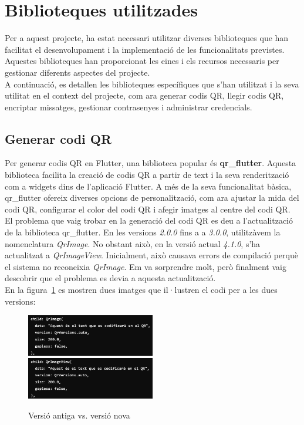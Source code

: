 \documentclass[a4paper,12pt,twoside]{ThesisStyle}
\begin{document}
\section{Biblioteques utilitzades}
\label{sec: Biblioteques utilitzades}


Per a aquest projecte, ha estat necessari utilitzar diverses biblioteques que han facilitat el desenvolupament i la implementació de les funcionalitats previstes. Aquestes biblioteques han proporcionat les eines i els recursos necessaris per gestionar diferents aspectes del projecte.\\

A continuació, es detallen les biblioteques específiques que s'han utilitzat i la seva utilitat en el context del projecte, com ara generar codis QR, llegir codis QR, encriptar missatges, gestionar contrasenyes i administrar credencials.




\subsection{Generar codi QR}
\label{subsec: Generar codi QR}

Per generar codis QR en Flutter, una biblioteca popular és \textbf{qr\_flutter}. Aquesta biblioteca facilita la creació de codis QR a partir de text i la seva renderització com a widgets dins de l'aplicació Flutter. A més de la seva funcionalitat bàsica, qr\_flutter ofereix diverses opcions de personalització, com ara ajustar la mida del codi QR, configurar el color del codi QR i afegir imatges al centre del codi QR.\\

El problema que vaig trobar en la generació del codi QR es deu a l'actualització de la biblioteca qr\_flutter. En les versions \textit{2.0.0} fins a a \textit{3.0.0}, utilitzàvem la nomenclatura \textit{QrImage}. No obstant això, en la versió actual \textit{4.1.0}, s'ha actualitzat a \textit{QrImageView}. Inicialment, això causava errors de compilació perquè el sistema no reconeixia \textit{QrImage}. Em va sorprendre molt, però finalment vaig descobrir que el problema es devia a aquesta actualització.\\ 

En la figura~\ref{fig:Versió antiga vs. versió nova}  es mostren dues imatges que il·lustren el codi per a les dues versions:

\begin{figure}[h]
    \centering
    \includegraphics[width=0.5\textwidth]{imatges/qrold.png}
    \includegraphics[width=0.5\textwidth]{imatges/qrnew.png}
    \caption{Versió antiga vs. versió nova}
    \label{fig:Versió antiga vs. versió nova}
\end{figure}
\end{document}
